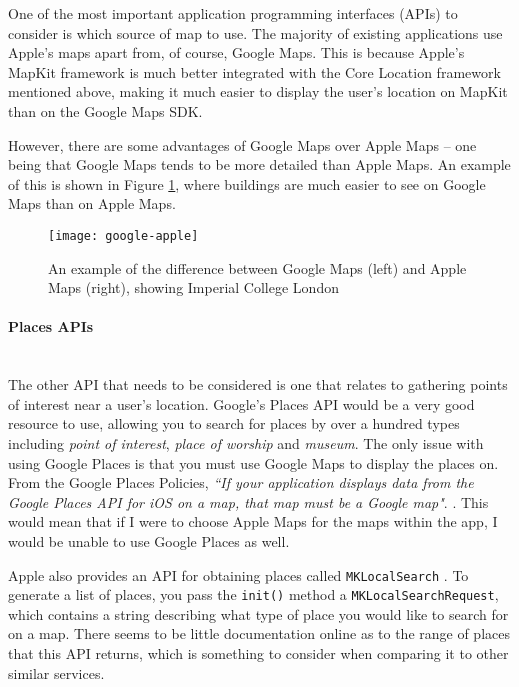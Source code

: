 One of the most important application programming interfaces (APIs) to consider is which source of map to use. The majority of existing applications use Apple's maps apart from, of course, Google Maps. This is because Apple's MapKit framework \cite{AppleInc.a} is much better integrated with the Core Location framework mentioned above, making it much easier to display the user's location on MapKit than on the Google Maps SDK.

However, there are some advantages of Google Maps over Apple Maps -- one being that Google Maps tends to be more detailed than Apple Maps. An example of this is shown in Figure \ref{fig:google-apple}, where buildings are much easier to see on Google Maps than on Apple Maps.

\begin{figure}[hbt]
  \centering
  \texttt{[image: google-apple]}
  \caption{An example of the difference between Google Maps (left) and Apple Maps (right), showing Imperial College London}
  \label{fig:google-apple}
\end{figure}


\paragraph{Places APIs}\mbox{}\\

The other API that needs to be considered is one that relates to gathering points of interest near a user's location. Google's Places API \cite{GoogleInc.b} would be a very good resource to use, allowing you to search for places by over a hundred types including \textit{point of interest}, \textit{place of worship} and \textit{museum}. The only issue with using Google Places is that you must use Google Maps to display the places on. From the Google Places Policies, \textit{``If your application displays data from the Google Places API for iOS on a map, that map must be a Google map"}. \cite{GoogleInc.c}. This would mean that if I were to choose Apple Maps for the maps within the app, I would be unable to use Google Places as well.

Apple also provides an API for obtaining places called \texttt{MKLocalSearch} \cite{AppleInc.b}. To generate a list of places, you pass the \texttt{init()} method a \texttt{MKLocalSearchRequest}, which contains a string describing what type of place you would like to search for on a map. There seems to be little documentation online as to the range of places that this API returns, which is something to consider when comparing it to other similar services.

